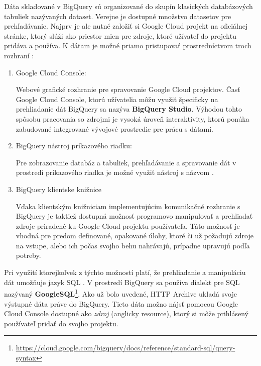 \pagebreak

Dáta skladované v BigQuery sú organizované do skupín klasických databázových tabuliek nazývaných dataset.
Verejne je dostupné množstvo datasetov pre prehľadávanie.
Najprv je ale nutné založiť si Google Cloud projekt na oficiálnej stránke, ktorý slúži ako priestor mien pre zdroje, ktoré užívateľ do projektu pridáva a používa.
K dátam je možné priamo pristupovať prostredníctvom troch rozhraní \cite{google-cloud}:
\begin{enumerate}
    \item Google Cloud Console:

    Webové grafické rozhranie pre spravovanie Google Cloud projektov. 
    Časť Google Cloud Console, ktorú užívatelia môžu využiť špecificky na prehliadanie dát BigQuery sa nazýva \textbf{BigQuery Studio}.
    Výhodou tohto spôsobu pracovania so zdrojmi je vysoká úroveň interaktivity, ktorú ponúka zabudované integrované vývojové prostredie pre prácu s dátami. 

    \item BigQuery nástroj príkazového riadku:

    Pre zobrazovanie databáz a tabuliek, prehľadávanie a spravovanie dát v prostredí príkazového riadka je možné využiť nástroj s názvom . 
    
    \item BigQuery klientske knižnice

    Vďaka klientským knižniciam implementujúcim komunikačné rozhranie s BigQuery je taktiež dostupná možnosť programovo manipulovať a prehliadať zdroje priradené ku Google Cloud projektu používateľa.
    Táto možnosť je vhodná pre predom definované, opakované úlohy, ktoré či už požadujú zdroje na vstupe, alebo ich počas svojho behu nahrávajú, prípadne upravujú podľa potreby.
\end{enumerate}

Pri využití ktorejkoľvek z týchto možností platí, že prehliadanie a manipuláciu dát umožňuje jazyk SQL \cite{google-bq}.
V prostredí BigQuery sa používa dialekt pre SQL nazývaný \textbf{GoogleSQL}\footnote{\href{https://cloud.google.com/bigquery/docs/reference/standard-sql/query-syntax}{https://cloud.google.com/bigquery/docs/reference/standard-sql/query-syntax}}.
Ako už bolo uvedené, HTTP Archive ukladá svoje výstupné dáta práve do BigQuery.
Tieto dáta možno nájsť pomocou Google Cloud Console dostupné ako \textit{zdroj} (anglicky resource), ktorý si môže prihlásený používateľ pridať do svojho projektu.

